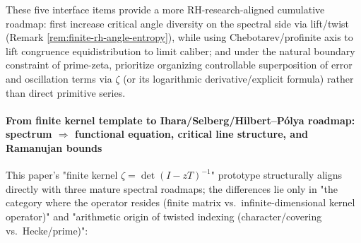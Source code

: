 These five interface items provide a more RH-research-aligned cumulative roadmap: first increase critical angle diversity on the spectral side via lift/twist (Remark \ref{rem:finite-rh-angle-entropy}), while using Chebotarev/profinite axis to lift congruence equidistribution to limit caliber; and under the natural boundary constraint of prime-zeta, prioritize organizing controllable superposition of error and oscillation terms via \(\zeta\) (or its logarithmic derivative/explicit formula) rather than direct primitive series.

\paragraph{From finite kernel template to Ihara/Selberg/Hilbert--Pólya roadmap: spectrum \texorpdfstring{$\Rightarrow$}{=>} functional equation, critical line structure, and Ramanujan bounds}
This paper's "finite kernel \(\zeta=\det(I-zT)^{-1}\)" prototype structurally aligns directly with three mature spectral roadmaps; the differences lie only in "the category where the operator resides (finite matrix vs.\ infinite-dimensional kernel operator)" and "arithmetic origin of twisted indexing (character/covering vs.\ Hecke/prime)":
